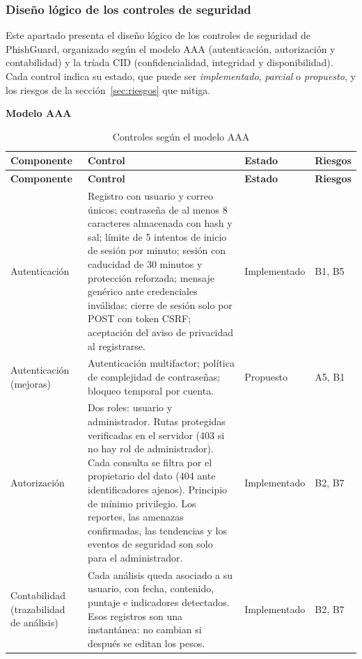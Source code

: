 \documentclass[journal,onecolumn,12pt,draftclsnofoot]{IEEEtran}
\newcommand{\apartado}[1]{\par\medskip\noindent\textbf{#1}\par\smallskip}
\begin{document}
\subsubsection{Diseño lógico de los controles de seguridad}\label{sec:controles}

Este apartado presenta el diseño lógico de los controles de seguridad de PhishGuard, organizado según el modelo AAA (autenticación, autorización y contabilidad) y la tríada CID (confidencialidad, integridad y disponibilidad). Cada control indica su estado, que puede ser \emph{implementado}, \emph{parcial} o \emph{propuesto}, y los riesgos de la sección~\ref{sec:riesgos} que mitiga.

\apartado{Modelo AAA}

\begingroup
\footnotesize
\setlength{\tabcolsep}{3pt}
\begin{longtable}{|>{\raggedright\arraybackslash}p{}|>{\raggedright\arraybackslash}p{}|>{\raggedright\arraybackslash}p{}|>{\raggedright\arraybackslash}p{}|}
\caption{Controles según el modelo AAA}\label{tab:aaa}\\
\hline
\textbf{Componente} & \textbf{Control} & \textbf{Estado} & \textbf{Riesgos} \\ \hline
\endfirsthead
\hline
\textbf{Componente} & \textbf{Control} & \textbf{Estado} & \textbf{Riesgos} \\ \hline
\endhead
Autenticación & Registro con usuario y correo únicos; contraseña de al menos 8 caracteres almacenada con hash y sal; límite de 5 intentos de inicio de sesión por minuto; sesión con caducidad de 30 minutos y protección reforzada; mensaje genérico ante credenciales inválidas; cierre de sesión solo por POST con token CSRF; aceptación del aviso de privacidad al registrarse. & Implementado & B1, B5 \\ \hline
Autenticación (mejoras) & Autenticación multifactor; política de complejidad de contraseñas; bloqueo temporal por cuenta. & Propuesto & A5, B1 \\ \hline
Autorización & Dos roles: usuario y administrador. Rutas protegidas verificadas en el servidor (403 si no hay rol de administrador). Cada consulta se filtra por el propietario del dato (404 ante identificadores ajenos). Principio de mínimo privilegio. Los reportes, las amenazas confirmadas, las tendencias y los eventos de seguridad son solo para el administrador. & Implementado & B2, B7 \\ \hline
Contabilidad (trazabilidad de análisis) & Cada análisis queda asociado a su usuario, con fecha, contenido, puntaje e indicadores detectados. Esos registros son una instantánea: no cambian si después se editan los pesos. & Implementado & B2, B7 \\ \hline

\end{longtable}
\end{document}
